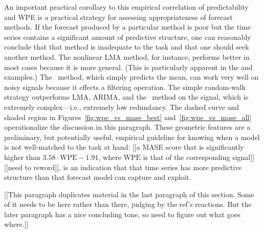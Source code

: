 
An important practical corollary to this empirical correlation of
predictability and WPE is a practical strategy for assessing
appropriateness of forecast methods.  If the forecast produced by a
particular method is poor but the time series contains a significant
amount of predictive structure, one can reasonably conclude that that
method is inadequate to the task and that one should seek another
method.  The nonlinear LMA method, for instance, performs better in
most cases because it is more general.  (This is particularly apparent
in the \col and \svdfive examples.)
The \naive ~method, which simply predicts the mean, can work very well
on noisy signals because it effects a filtering operation.  The simple
random-walk strategy outperforms LMA, ARIMA, and the \naive ~method on
the \gcc signal, which is extremely complex---i.e., extremely low
redundancy.
The dashed curve and shaded region in
Figures~\ref{fig:wpe_vs_mase_best} and~\ref{fig:wpe_vs_mase_all}
operationalize the discussion in this paragraph.  These geometric
features are a preliminary, but potentially useful, empirical
guideline for knowing when a model is not well-matched to the task at
hand: [[a MASE score that is significantly higher than $3.58 \cdot
    \mathrm{WPE} - 1.91$, where $\mathrm{WPE}$ is that of the
    corresponding signal]] [[need to reword]], is an indication that
that time series has more predictive structure than that forecast
model can capture and exploit.

[[This paragraph duplicates material in the last paragraph of this
    section.  Some of it needs to be here rather than there, judging
    by the ref's reactions.  But the later paragraph has a nice
    concluding tone, so need to figure out what goes where.]]

